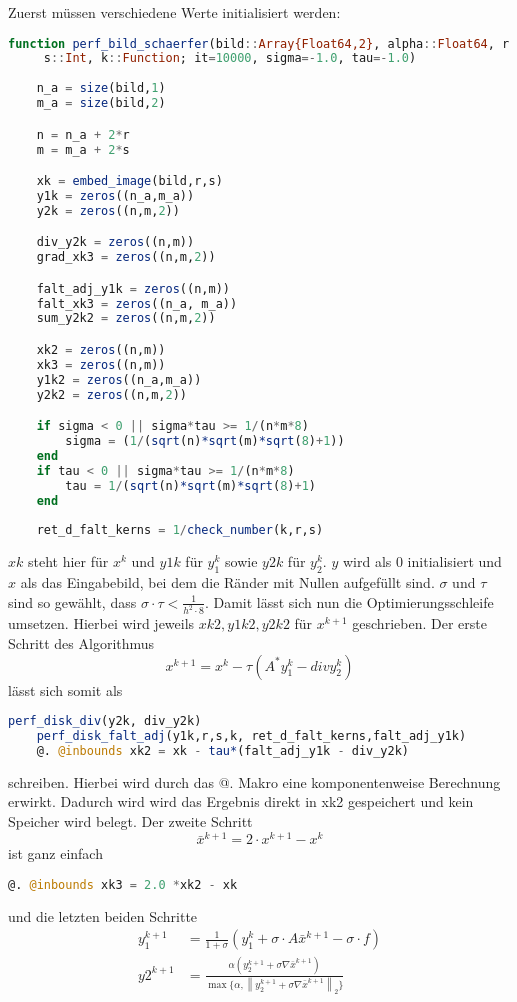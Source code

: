 \documentclass{article}
\theoremstyle{case}
\newcommand{\norm}[1]{\left\lVert#1\right\rVert}
\begin{document}
Zuerst müssen verschiedene Werte initialisiert werden:
\begin{lstlisting}[language=Julia]
function perf_bild_schaerfer(bild::Array{Float64,2}, alpha::Float64, r::Int,
	 s::Int, k::Function; it=10000, sigma=-1.0, tau=-1.0)
	
	n_a = size(bild,1)
	m_a = size(bild,2)

	n = n_a + 2*r
	m = m_a + 2*s

	xk = embed_image(bild,r,s)
	y1k = zeros((n_a,m_a))
	y2k = zeros((n,m,2))

	div_y2k = zeros((n,m))
	grad_xk3 = zeros((n,m,2))

	falt_adj_y1k = zeros((n,m))
	falt_xk3 = zeros((n_a, m_a))
	sum_y2k2 = zeros((n,m,2))

	xk2 = zeros((n,m))
	xk3 = zeros((n,m))
	y1k2 = zeros((n_a,m_a))
	y2k2 = zeros((n,m,2))

	if sigma < 0 || sigma*tau >= 1/(n*m*8)
		sigma = (1/(sqrt(n)*sqrt(m)*sqrt(8)+1))
	end
	if tau < 0 || sigma*tau >= 1/(n*m*8)
		tau = 1/(sqrt(n)*sqrt(m)*sqrt(8)+1)
	end
	
	ret_d_falt_kerns = 1/check_number(k,r,s)
\end{lstlisting}
$xk$ steht hier für $x^{k}$ und $y1k$ für $y_{1}^{k}$ sowie $y2k$ für $y_{2}^{k}$. $y$ wird als $0$ initialisiert und $x$ als das Eingabebild, bei dem die Ränder mit Nullen aufgefüllt sind. $\sigma$ und $\tau$ sind so gewählt, dass $\sigma\cdot \tau < \frac{1}{h^{2}\cdot 8}$. Damit lässt sich nun die Optimierungsschleife umsetzen. Hierbei wird jeweils $xk2, y1k2,y2k2$ für $x^{k+1}$ geschrieben. Der erste Schritt des Algorithmus
\[
x^{k+1} = x^{k} - \tau (A^{*}y_{1}^{k} - div y_{2}^{k})
\]
lässt sich somit als
\begin{lstlisting}[language=Julia]
	perf_disk_div(y2k, div_y2k)
	perf_disk_falt_adj(y1k,r,s,k, ret_d_falt_kerns,falt_adj_y1k)
	@. @inbounds xk2 = xk - tau*(falt_adj_y1k - div_y2k)
\end{lstlisting}
schreiben.
Hierbei wird durch das @. Makro eine komponentenweise Berechnung erwirkt. Dadurch wird wird das Ergebnis direkt in xk2 gespeichert und kein Speicher wird belegt.\newline
Der zweite Schritt
\[
\bar{x}^{k+1} = 2\cdot x^{k+1} - x^{k}
\]
ist ganz einfach
\begin{lstlisting}[language=Julia]
	@. @inbounds xk3 = 2.0 *xk2 - xk
\end{lstlisting}
und die letzten beiden Schritte
\begin{align*}
y_{1}^{k+1} &= \frac{1}{1+\sigma} (y_{1}^{k} + \sigma\cdot A \bar{x}^{k+1} - \sigma\cdot f) \\
y{2}^{k+1} &= \frac{\alpha (y_{2}^{k+1} + \sigma \nabla \bar{x}^{k+1} )}{\max\{\alpha, \norm{y_{2}^{k+1} + \sigma \nabla \bar{x}^{k+1} }_{2}\}}
\end{align*}
\end{document}
